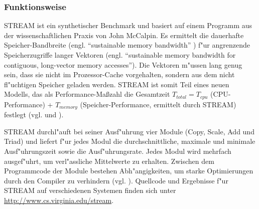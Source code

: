 
\subsubsection{Funktionsweise}\label{Funktion-STREAM}

STREAM ist ein synthetischer Benchmark und basiert auf einem Programm aus der wissenschaftlichen Praxis von John McCalpin. Es ermittelt die dauerhafte Speicher-Bandbreite (engl. "`sustainable memory bandwidth"' \cite{mcc95}) f"ur angrenzende Speicherzugriffe langer Vektoren (engl. "`sustainable memory bandwidth for contiguous, long-vector memory accesses"'\cite{mcc95}). Die Vektoren m"ussen lang genug sein, dass sie nicht im Prozessor-Cache vorgehalten, sondern aus dem nicht fl"uchtigen Speicher geladen werden. STREAM ist somit Teil eines neuen Modells, das als Performance-Ma\ss zahl die Gesamtzeit $T_{total} = T_{cpu}$ (CPU-Performance) + $T_{memory}$ (Speicher-Performance, ermittelt durch STREAM) festlegt (vgl. \cite{mcc95} und \cite{mcc05}). 

STREAM durchl"auft bei seiner Ausf"uhrung vier Module (Copy, Scale, Add und Triad) und liefert f"ur jedes Modul die durchschnittliche, maximale und minimale Ausf"uhrungszeit sowie die Ausf"uhrungsrate. Jedes Modul wird mehrfach ausgef"uhrt, um verl"assliche Mittelwerte zu erhalten. Zwischen dem Programmcode der Module bestehen Abh"angigkeiten, um starke Optimierungen durch den Compiler zu verhindern (vgl. \cite{mcc05}). Quellcode und Ergebnisse f"ur STREAM auf verschiedenen Systemen finden sich unter \url{http://www.cs.virginia.edu/stream}.   

